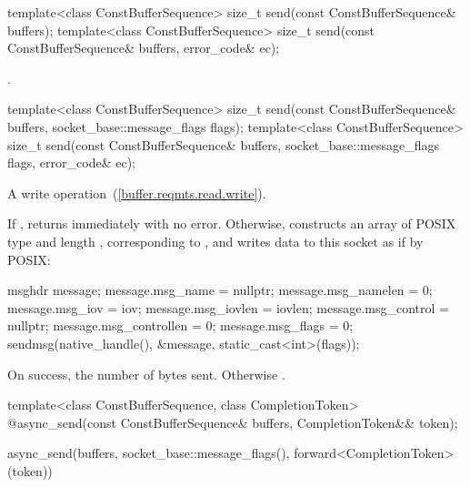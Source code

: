 \begin{itemdecl}
template<class ConstBufferSequence>
  size_t send(const ConstBufferSequence& buffers);
template<class ConstBufferSequence>
  size_t send(const ConstBufferSequence& buffers, error_code& ec);
\end{itemdecl}

\begin{itemdescr}
\pnum
\returns {}.
\end{itemdescr}

\begin{itemdecl}
template<class ConstBufferSequence>
  size_t send(const ConstBufferSequence& buffers,
              socket_base::message_flags flags);
template<class ConstBufferSequence>
  size_t send(const ConstBufferSequence& buffers,
              socket_base::message_flags flags, error_code& ec);
\end{itemdecl}

\begin{itemdescr}
\pnum
A write operation~(\ref{buffer.reqmts.read.write}).

\pnum
\effects If , returns immediately with no error. Otherwise, constructs an array  of POSIX type  and length , corresponding to , and writes data to this socket as if by POSIX: 
\begin{codeblock}
msghdr message;
message.msg_name = nullptr;
message.msg_namelen = 0;
message.msg_iov = iov;
message.msg_iovlen = iovlen;
message.msg_control = nullptr;
message.msg_controllen = 0;
message.msg_flags = 0;
sendmsg(native_handle(), &message, static_cast<int>(flags));
\end{codeblock}


\pnum
\returns On success, the number of bytes sent. Otherwise .
\end{itemdescr}

\begin{itemdecl}
template<class ConstBufferSequence, class CompletionToken>
  @\DEDUCED@ async_send(const ConstBufferSequence& buffers, CompletionToken&& token);
\end{itemdecl}

\begin{itemdescr}
\pnum
\returns
\begin{codeblock}
async_send(buffers, socket_base::message_flags(), forward<CompletionToken>(token))
\end{codeblock}
\end{itemdescr}

